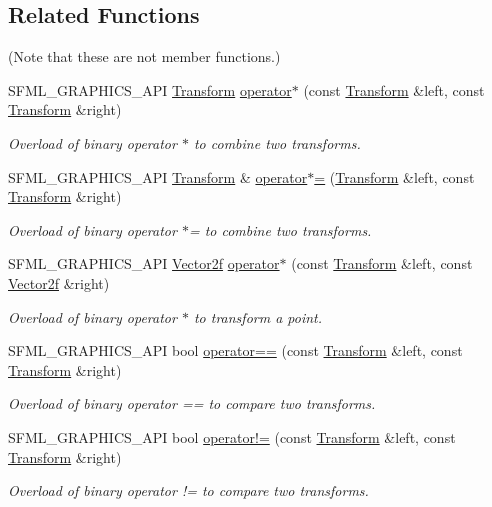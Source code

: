 \subsection*{Related Functions}
(Note that these are not member functions.) \begin{DoxyCompactItemize}
\item 
S\+F\+M\+L\+\_\+\+G\+R\+A\+P\+H\+I\+C\+S\+\_\+\+A\+PI \mbox{\hyperlink{classsf_1_1_transform}{Transform}} \mbox{\hyperlink{classsf_1_1_transform_a423ade8d6aa1378c695f8eb4bfce8981}{operator$\ast$}} (const \mbox{\hyperlink{classsf_1_1_transform}{Transform}} \&left, const \mbox{\hyperlink{classsf_1_1_transform}{Transform}} \&right)
\begin{DoxyCompactList}\small\item\em Overload of binary operator $\ast$ to combine two transforms. \end{DoxyCompactList}\item 
S\+F\+M\+L\+\_\+\+G\+R\+A\+P\+H\+I\+C\+S\+\_\+\+A\+PI \mbox{\hyperlink{classsf_1_1_transform}{Transform}} \& \mbox{\hyperlink{classsf_1_1_transform_a45a9de70a463117f851f1264a6f558ba}{operator$\ast$=}} (\mbox{\hyperlink{classsf_1_1_transform}{Transform}} \&left, const \mbox{\hyperlink{classsf_1_1_transform}{Transform}} \&right)
\begin{DoxyCompactList}\small\item\em Overload of binary operator $\ast$= to combine two transforms. \end{DoxyCompactList}\item 
S\+F\+M\+L\+\_\+\+G\+R\+A\+P\+H\+I\+C\+S\+\_\+\+A\+PI \mbox{\hyperlink{classsf_1_1_vector2}{Vector2f}} \mbox{\hyperlink{classsf_1_1_transform_ac729169ec3036f3f3f3024c98efd041d}{operator$\ast$}} (const \mbox{\hyperlink{classsf_1_1_transform}{Transform}} \&left, const \mbox{\hyperlink{classsf_1_1_vector2}{Vector2f}} \&right)
\begin{DoxyCompactList}\small\item\em Overload of binary operator $\ast$ to transform a point. \end{DoxyCompactList}\item 
S\+F\+M\+L\+\_\+\+G\+R\+A\+P\+H\+I\+C\+S\+\_\+\+A\+PI bool \mbox{\hyperlink{classsf_1_1_transform_a542b6e28b891d92b68acbb6cf4c1165e}{operator==}} (const \mbox{\hyperlink{classsf_1_1_transform}{Transform}} \&left, const \mbox{\hyperlink{classsf_1_1_transform}{Transform}} \&right)
\begin{DoxyCompactList}\small\item\em Overload of binary operator == to compare two transforms. \end{DoxyCompactList}\item 
S\+F\+M\+L\+\_\+\+G\+R\+A\+P\+H\+I\+C\+S\+\_\+\+A\+PI bool \mbox{\hyperlink{classsf_1_1_transform_ae8ea92b5f2531547173b510b5fe80eb9}{operator!=}} (const \mbox{\hyperlink{classsf_1_1_transform}{Transform}} \&left, const \mbox{\hyperlink{classsf_1_1_transform}{Transform}} \&right)
\begin{DoxyCompactList}\small\item\em Overload of binary operator != to compare two transforms. \end{DoxyCompactList}\end{DoxyCompactItemize}


